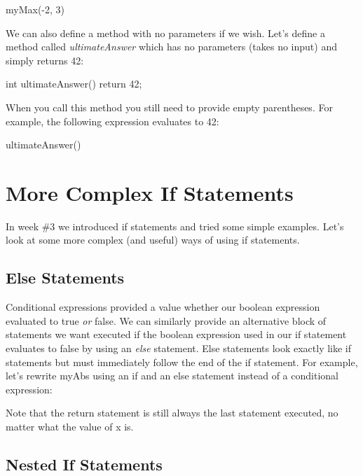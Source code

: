 \begin{code}
myMax(-2, 3)
\end{code}

We can also define a method with no parameters if we wish. Let's define a method called \textit{ultimateAnswer} which has no parameters (takes no input) and simply returns 42:

\begin{code}
int ultimateAnswer() {
	return 42;
}
\end{code}

When you call this method you still need to provide empty parentheses. For example, the following expression evaluates to 42:

\begin{code}
ultimateAnswer()
\end{code}

\section{More Complex If Statements}

In week \#3 we introduced if statements and tried some simple examples. Let's look at some more complex (and useful) ways of using if statements.

\subsection{Else Statements}

Conditional expressions provided a value whether our boolean expression evaluated to true \textit{or} false. We can similarly provide an alternative block of statements we want executed if the boolean expression used in our if statement evaluates to false by using an \textit{else} statement. Else statements look exactly like if statements but must immediately follow the end of the if statement. For example, let's rewrite myAbs using an if and an else statement instead of a conditional expression:


\begin{code}
double myAbs(double x) {
	if(x > 0) {
		return x;
	else {
		return -x;
	}
}
\end{code}

Note that the return statement is still always the last statement executed, no matter what the value of x is. 

\subsection{Nested If Statements}

